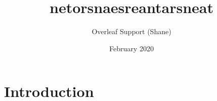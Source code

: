 \documentclass{article}
\title{netorsnaesreantarsneat}
\author{Overleaf Support (Shane)}
\date{February 2020}
\begin{document}
\maketitle

\section{Introduction}
\end{document}
